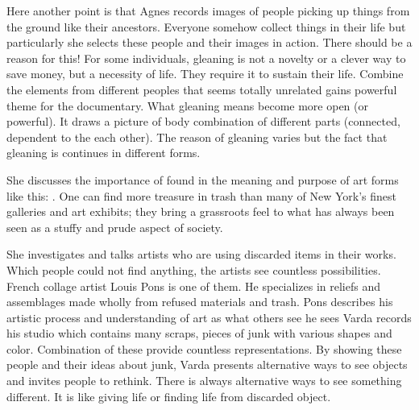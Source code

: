 Here another point is that Agnes records images of people picking up things from the ground like their ancestors. Everyone somehow collect things in their life but particularly she selects these people and their images in action. There should be a reason for this! For some individuals, gleaning is not a novelty or a clever way to save money, but a necessity of life. They require it to sustain their life. Combine the elements from different peoples that seems totally unrelated gains powerful theme for the documentary. What gleaning means become more open (or powerful). It draws a picture of body combination of different parts (connected, dependent to the each other). The reason of gleaning varies but the fact that gleaning is continues in different forms.

She discusses the importance of found in the meaning and purpose of art forms like this:  \cite{cruickshank2007work}. One can find more treasure in trash than many of New York’s finest galleries and art exhibits; they bring a grassroots feel to what has always been seen as a stuffy and prude aspect of society.

She investigates and talks artists who are using discarded items in their works. Which people could not find anything, the artists see countless possibilities. French collage artist Louis Pons is one of them. He specializes in reliefs and assemblages made wholly from refused materials and trash. Pons describes his artistic process and understanding of art as what others see  he sees  Varda records his studio which contains many scraps, pieces of junk with various shapes and color. Combination of these provide countless representations. By showing these people and their ideas about junk, Varda presents alternative ways to see objects and invites people to rethink. There is always alternative ways to see something different. It is like giving life or finding life from discarded object.










